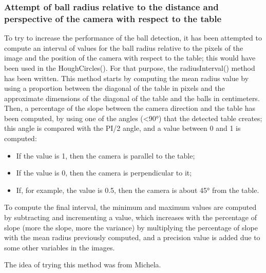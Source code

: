 \subsubsection{Attempt of ball radius relative to the distance and perspective of the camera with respect to the table}

To try to increase the performance of the ball detection, it has been attempted to compute an interval of values for the ball radius relative to the pixels of the image and the position of the camera with respect to the table; this would have been used in the HoughCircles(). For that purpose, the radiusInterval() method has been written. This method starts by computing the mean radius value by using a proportion between the diagonal of the table in pixels and the approximate dimensions of the diagonal of the table and the balls in centimeters. Then, a percentage of the slope between the camera direction and the table has been computed, by using one of the angles (<90°) that the detected table creates; this angle is compared with the PI/2 angle, and a value between 0 and 1 is computed:

\begin{itemize}
	\item If the value is 1, then the camera is parallel to the table;
	\item If the value is 0, then the camera is perpendicular to it;
	\item If, for example, the value is 0.5, then the camera is about 45° from the table.
\end{itemize}
	
To compute the final interval, the minimum and maximum values are computed by subtracting and incrementing a value, which increases with the percentage of slope (more the slope, more the variance) by multiplying the percentage of slope with the mean radius previously computed, and a precision value is added due to some other variables in the images.\

The idea of trying this method was from Michela.
